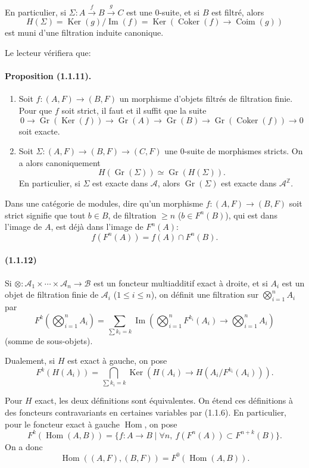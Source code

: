 \documentclass[10pt]{article}
\newcommand{\Z}{\mathbb Z}
\newcommand{\Gr}{\operatorname{Gr}}
\newcommand{\Ker}{\operatorname{Ker}}
\newcommand{\Coker}{\operatorname{Coker}}
\newcommand{\Coim}{\operatorname{Coim}}
\newcommand{\Imop}{\operatorname{Im}}
\newcommand{\Hom}{\operatorname{Hom}}
\newcommand{\calA}{\mathcal A}
\newcommand{\calB}{\mathcal B}
\begin{document}
En particulier, si $\Sigma:A\xrightarrow{f}B\xrightarrow{g}C$ est une $0$-suite, et si $B$ est filtré, alors
\[
H(\Sigma)=\Ker(g)/\Imop(f)=\Ker(\Coker(f)\to\Coim(g))
\]
est muni d'une filtration induite canonique.

Le lecteur vérifiera que:

\paragraph{Proposition (1.1.11).} \begin{enumerate}[label=(\roman*)]
\item Soit $f:(A,F)\to(B,F)$ un morphisme d'objets filtrés de filtration finie. Pour que $f$ soit strict, il faut et il suffit que la suite
\[
0\to\Gr(\Ker(f))\to\Gr(A)\to\Gr(B)\to\Gr(\Coker(f))\to0
\]
soit exacte.
\item Soit $\Sigma:(A,F)\to(B,F)\to(C,F)$ une $0$-suite de morphismes stricts. On a alors canoniquement
\[
H(\Gr(\Sigma))\simeq\Gr(H(\Sigma)).
\]
En particulier, si $\Sigma$ est exacte dans $\calA$, alors $\Gr(\Sigma)$ est exacte dans $\calA^{\Z}$.
\end{enumerate}

Dans une catégorie de modules, dire qu'un morphisme $f:(A,F)\to(B,F)$ soit strict signifie que tout $b\in B$, de filtration $\ge n$ ($b\in F^n(B)$), qui est dans l'image de $A$, est déjà dans l'image de $F^n(A)$:
\[
f(F^n(A))=f(A)\cap F^n(B).
\]

\paragraph{(1.1.12)} Si $\otimes:\calA_1\times\cdots\times\calA_n\to\calB$ est un foncteur multiadditif exact à droite, et si $A_i$ est un objet de filtration finie de $\calA_i$ ($1\le i\le n$), on définit une filtration sur $\bigotimes_{i=1}^nA_i$ par
\[
F^k\left(\bigotimes_{i=1}^n A_i\right)=\sum_{\sum k_i=k}\Imop\left(\bigotimes_{i=1}^n F^{k_i}(A_i)\to\bigotimes_{i=1}^n A_i\right)
\]
(somme de sous-objets).

Dualement, si $H$ est exact à gauche, on pose
\[
F^k(H(A_i))=\bigcap_{\sum k_i=k}\Ker\left(H(A_i)\to H(A_i/F^{k_i}(A_i))\right).
\]

Pour $H$ exact, les deux définitions sont équivalentes. On étend ces définitions à des foncteurs contravariants en certaines variables par (1.1.6). En particulier, pour le foncteur exact à gauche $\Hom$, on pose
\[
F^k(\Hom(A,B))=\{f:A\to B\mid \forall n,\ f(F^n(A))\subset F^{n+k}(B)\}.
\]
On a donc
\[
\Hom((A,F),(B,F))=F^0(\Hom(A,B)).
\]
\end{document}
